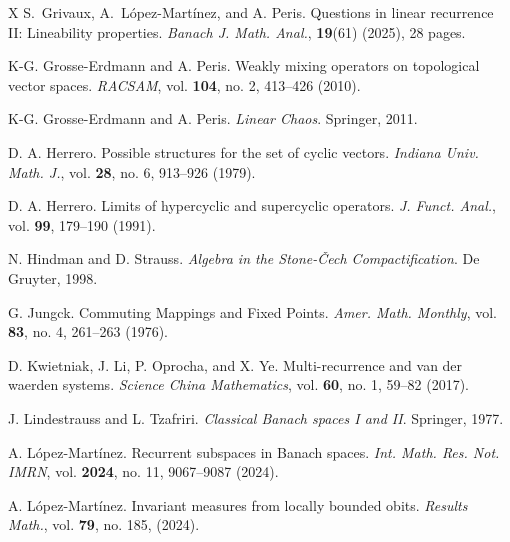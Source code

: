 \documentclass[openright,11pt]{article}
\theoremstyle{plain}
\theoremstyle{definition}
\begin{document}
{\begin{thebibliography}{X}
	 S.~Grivaux, A.~L\'opez-Mart\'inez, and A. Peris. Questions in linear recurrence II: Lineability properties. \textit{Banach J. Math. Anal.}, \textbf{19}(61) (2025), 28 pages.%
	
	 K-G. Grosse-Erdmann and A. Peris. Weakly mixing operators on topological vector spaces. \textit{RACSAM}, vol. \textbf{104}, no. 2, 413--426 (2010).%
	
	 K-G. Grosse-Erdmann and A. Peris. \textit{Linear Chaos}. Springer, 2011.%
	
	 D. A. Herrero. Possible structures for the set of cyclic vectors. \textit{Indiana Univ. Math. J.}, vol. \textbf{28}, no. 6, 913--926 (1979).%

	 D. A. Herrero. Limits of hypercyclic and supercyclic operators. \textit{J. Funct. Anal.}, vol. \textbf{99}, 179--190 (1991).%

	 N. Hindman and D. Strauss. \textit{Algebra in the Stone-\v{C}ech Compactification}. De Gruyter, 1998.%
	
	 G. Jungck. Commuting Mappings and Fixed Points. \textit{Amer. Math. Monthly}, vol. \textbf{83}, no. 4, 261--263 (1976).%
	
	 D. Kwietniak, J. Li, P. Oprocha, and X. Ye. Multi-recurrence and van der waerden systems. \textit{Science China Mathematics}, vol. \textbf{60}, no. 1, 59--82 (2017).%
	
	 J. Lindestrauss and L. Tzafriri. \textit{Classical Banach spaces I and II}. Springer, 1977.%
	
	 A. L\'opez-Mart\'inez. Recurrent subspaces in Banach spaces. \textit{Int. Math. Res. Not. IMRN}, vol. \textbf{2024}, no. 11, 9067--9087 (2024).%
	
	 A. L\'opez-Mart\'inez. Invariant measures from locally bounded obits. \textit{Results Math.}, vol. \textbf{79}, no. 185, (2024).%
	

\end{thebibliography}}
\end{document}
